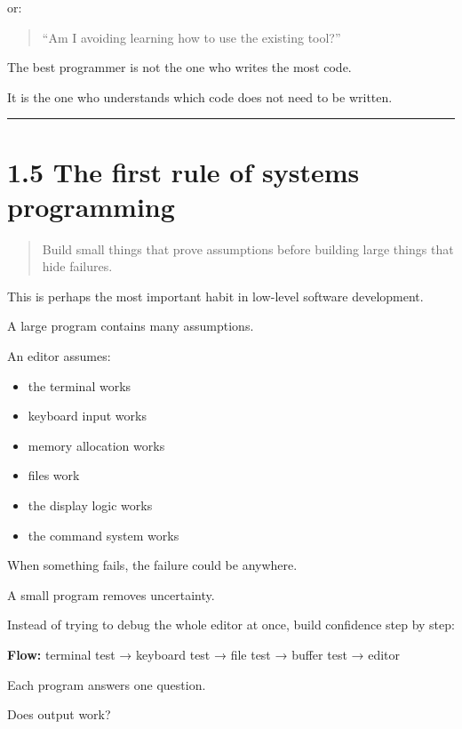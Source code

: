 \documentclass[
  oneside,
  openany]{book}
\providecommand{\tightlist}{%
  \setlength{\itemsep}{0pt}\setlength{\parskip}{0pt}}
\begin{document}
or:

\begin{quote}
``Am I avoiding learning how to use the existing tool?''
\end{quote}

The best programmer is not the one who writes the most code.

It is the one who understands which code does not need to be written.

\begin{center}\rule{0.5\linewidth}{0.5pt}\end{center}

\hypertarget{the-first-rule-of-systems-programming}{%
\section{1.5 The first rule of systems
programming}\label{the-first-rule-of-systems-programming}}

\begin{quote}
Build small things that prove assumptions before building large things
that hide failures.
\end{quote}

This is perhaps the most important habit in low-level software
development.

A large program contains many assumptions.

An editor assumes:

\begin{itemize}
\tightlist
\item
  the terminal works
\item
  keyboard input works
\item
  memory allocation works
\item
  files work
\item
  the display logic works
\item
  the command system works
\end{itemize}

When something fails, the failure could be anywhere.

A small program removes uncertainty.

Instead of trying to debug the whole editor at once, build confidence
step by step:

\textbf{Flow:} terminal test → keyboard test → file test → buffer test →
editor

Each program answers one question.

Does output work?
\end{document}
